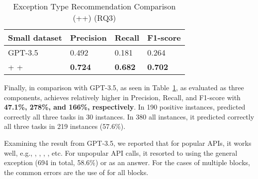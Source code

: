 \begin{table}[t]%
  \caption{Exception Type Recommendation Comparison (\xblock+\xstate+\xtype) (RQ3)}
  \vspace{-12pt}
  \small
	\begin{center}
		\renewcommand{\arraystretch}{1}
		\begin{tabular}{| p{3.10cm}<{\centering} | p{1.2cm}<{\centering} | p{1.2cm}<{\centering}| p{1.2cm}<{\centering}|}
		  \hline
			Small dataset  & Precision  & Recall & F1-score \\
			\hline
                        GPT-3.5 & 0.492 & 0.181 & 0.264 \\
			\hline
			\xblock + \xstate  + \xtype  & \textbf{0.724}  &  \textbf{0.682} & \textbf{0.702}\\
			\hline
		\end{tabular}
		\label{tab:xtype-2}
	\end{center}

\end{table}

Finally, in comparison with GPT-3.5, as seen in
Table~\ref{tab:xtype-2}, {\tool} as evaluated as three components,
achieves relatively higher in Precision, Recall, and F1-score with
{\bf 47.1\%, 278\%, and 166\%, respectively}. In 190 positive
instances, {\tool} predicted correctly all three tasks in 30
instances. In 380 all instances, it predicted correctly all
three tasks in 219 instances (57.6\%).

Examining the result from GPT-3.5, we reported that for popular APIs,
it works well, e.g., ,
, ,
, etc. For
unpopular API calls, it resorted to using the general exception
 (694 in total, 58.6\%) or 
as an answer. For the cases of multiple  blocks, the
common errors are the use of  for all blocks.

